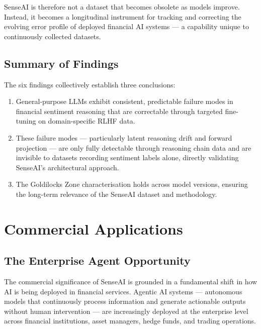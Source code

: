 \documentclass[11pt,a4paper]{article}
\begin{document}
SenseAI is therefore not a dataset that becomes obsolete as models improve. Instead,
it becomes a longitudinal instrument for tracking and correcting the evolving error
profile of deployed financial AI systems --- a capability unique to continuously
collected datasets.

\subsection{Summary of Findings}

The six findings collectively establish three conclusions:

\begin{enumerate}[leftmargin=2em, itemsep=4pt]
  \item General-purpose LLMs exhibit consistent, predictable failure modes in financial
        sentiment reasoning that are correctable through targeted fine-tuning on
        domain-specific RLHF data.
  \item These failure modes --- particularly latent reasoning drift and forward projection
        --- are only fully detectable through reasoning chain data and are invisible to
        datasets recording sentiment labels alone, directly validating SenseAI's
        architectural approach.
  \item The Goldilocks Zone characterisation holds across model versions, ensuring the
        long-term relevance of the SenseAI dataset and methodology.
\end{enumerate}

\section{Commercial Applications}
\label{sec:commercial}

\subsection{The Enterprise Agent Opportunity}

The commercial significance of SenseAI is grounded in a fundamental shift in how AI
is being deployed in financial services. Agentic AI systems --- autonomous models
that continuously process information and generate actionable outputs without human
intervention --- are increasingly deployed at the enterprise level across financial
institutions, asset managers, hedge funds, and trading operations.
\end{document}
